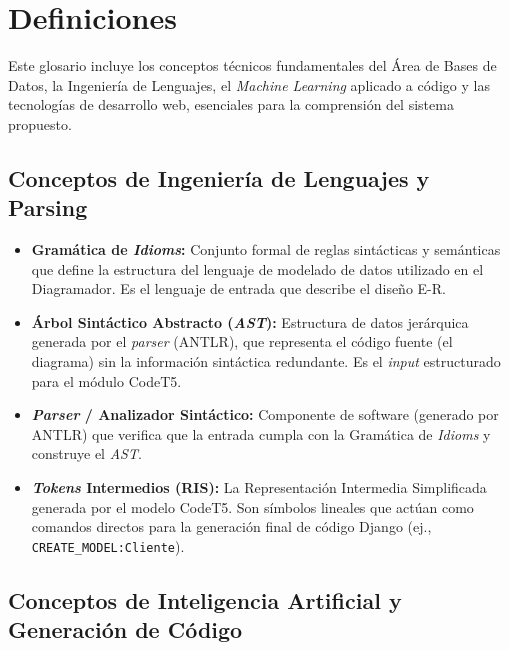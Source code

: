 \section{Definiciones}
\label{sec:definiciones}

Este glosario incluye los conceptos técnicos fundamentales del Área de Bases de Datos, la Ingeniería de Lenguajes, el \textit{Machine Learning} aplicado a código y las tecnologías de desarrollo web, esenciales para la comprensión del sistema propuesto.

\subsection{Conceptos de Ingeniería de Lenguajes y Parsing}
\label{subsec:def-lenguajes-parsing}

\begin{itemize}
    \item \textbf{Gramática de \textit{Idioms}:} Conjunto formal de reglas sintácticas y semánticas que define la estructura del lenguaje de modelado de datos utilizado en el Diagramador. Es el lenguaje de entrada que describe el diseño E-R.
    \item \textbf{Árbol Sintáctico Abstracto (\textit{AST}):} Estructura de datos jerárquica generada por el \textit{parser} (ANTLR), que representa el código fuente (el diagrama) sin la información sintáctica redundante. Es el \textit{input} estructurado para el módulo CodeT5.
    \item \textbf{\textit{Parser} / Analizador Sintáctico:} Componente de software (generado por ANTLR) que verifica que la entrada cumpla con la Gramática de \textit{Idioms} y construye el \textit{AST}.
    \item \textbf{\textit{Tokens} Intermedios (RIS):} La Representación Intermedia Simplificada generada por el modelo CodeT5. Son símbolos lineales que actúan como comandos directos para la generación final de código Django (ej., \texttt{CREATE\_MODEL:Cliente}).
\end{itemize}

\subsection{Conceptos de Inteligencia Artificial y Generación de Código}
\label{subsec:def-ia-codigo}

